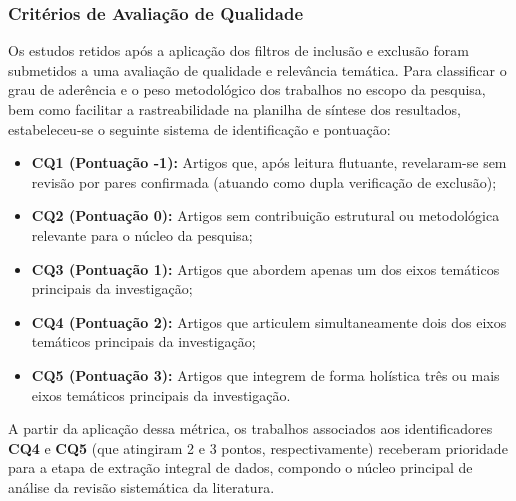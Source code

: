 \documentclass[
	12pt,				%
	oneside,			%
	a4paper,			%
	english,			%
	brazil				%
	]{abntex2ppgsi}
\begin{document}
  \subsubsection{Critérios de Avaliação de Qualidade}
\label{crit:quali}

    Os estudos retidos após a aplicação dos filtros de inclusão e exclusão foram submetidos a uma avaliação de qualidade e relevância temática. Para classificar o grau de aderência e o peso metodológico dos trabalhos no escopo da pesquisa, bem como facilitar a rastreabilidade na planilha de síntese dos resultados, estabeleceu-se o seguinte sistema de identificação e pontuação:

\begin{itemize}
    \item[] \textbf{CQ1 (Pontuação -1):} Artigos que, após leitura flutuante, revelaram-se sem revisão por pares confirmada (atuando como dupla verificação de exclusão);
    \item[] \textbf{CQ2 (Pontuação 0):} Artigos sem contribuição estrutural ou metodológica relevante para o núcleo da pesquisa;
    \item[] \textbf{CQ3 (Pontuação 1):} Artigos que abordem apenas um dos eixos temáticos principais da investigação;
    \item[] \textbf{CQ4 (Pontuação 2):} Artigos que articulem simultaneamente dois dos eixos temáticos principais da investigação;
    \item[] \textbf{CQ5 (Pontuação 3):} Artigos que integrem de forma holística três ou mais eixos temáticos principais da investigação.
\end{itemize}

    A partir da aplicação dessa métrica, os trabalhos associados aos identificadores \textbf{CQ4} e \textbf{CQ5} (que atingiram 2 e 3 pontos, respectivamente) receberam prioridade para a etapa de extração integral de dados, compondo o núcleo principal de análise da revisão sistemática da literatura.
   

   


\end{document}
